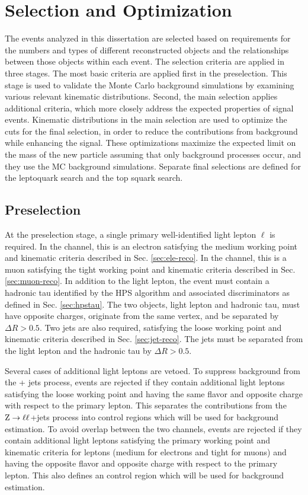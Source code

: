 \section{Selection and Optimization}

The events analyzed in this dissertation are selected based on requirements for the numbers and types of different reconstructed objects and the relationships between those objects within each event. The selection criteria are applied in three stages. The most basic criteria are applied first in the preselection. This stage is used to validate the Monte Carlo background simulations by examining various relevant kinematic distributions. Second, the main selection applies additional criteria, which more closely address the expected properties of signal events. Kinematic distributions in the main selection are used to optimize the cuts for the final selection, in order to reduce the contributions from background while enhancing the signal. These optimizations maximize the expected limit on the mass of the new particle assuming that only background processes occur, and they use the MC background simulations. Separate final selections are defined for the leptoquark search and the top squark search.

\subsection{Preselection
\label{sec:presel}}

At the preselection stage, a single primary well-identified light lepton $\ell$ is required. In the \etau channel, this is an electron satisfying the medium working point and kinematic criteria described in Sec. \ref{sec:ele-reco}. In the \mutau channel, this is a muon satisfying the tight working point and kinematic criteria described in Sec. \ref{sec:muon-reco}. In addition to the light lepton, the event must contain a hadronic tau identified by the HPS algorithm and associated discriminators as defined in Sec. \ref{sec:hpstau}. The two objects, light lepton and hadronic tau, must have opposite charges, originate from the same vertex, and be separated by $\Delta R > 0.5$. Two jets are also required, satisfying the loose working point and kinematic criteria described in Sec. \ref{sec:jet-reco}. The jets must be separated from the light lepton and the hadronic tau by $\Delta R > 0.5$.

Several cases of additional light leptons are vetoed. To suppress background from the \Z + jets process, events are rejected if they contain additional light leptons satisfying the loose working point and having the same flavor and opposite charge with respect to the primary lepton. This separates the contributions from the $\mathrm{Z} \rightarrow \ell\ell$+jets process into control regions which will be used for background estimation. To avoid overlap between the two channels, events are rejected if they contain additional light leptons satisfying the primary working point and kinematic criteria for leptons (medium for electrons and tight for muons) and having the opposite flavor and opposite charge with respect to the primary lepton. This also defines an \emu control region which will be used for background estimation.

